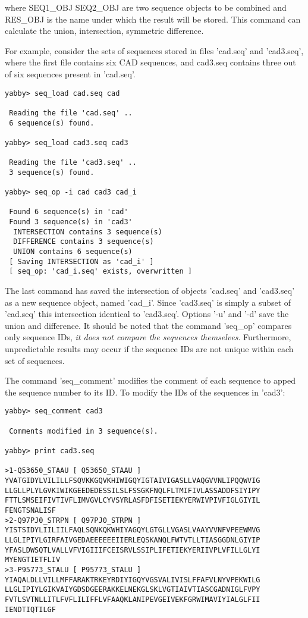 where SEQ1\_OBJ SEQ2\_OBJ are two sequence objects to be combined 
and RES\_OBJ is the name under which the result will be stored.
This command can calculate the union, intersection, symmetric
difference.

For example, consider the sets of sequences stored in files
'cad.seq' and 'cad3.seq', where the first file contains six 
CAD sequences, and cad3.seq contains three out of six sequences
present in 'cad.seq'.

\begin{verbatim}
yabby> seq_load cad.seq cad

 Reading the file 'cad.seq' ..
 6 sequence(s) found.

yabby> seq_load cad3.seq cad3

 Reading the file 'cad3.seq' ..
 3 sequence(s) found.

yabby> seq_op -i cad cad3 cad_i

 Found 6 sequence(s) in 'cad'
 Found 3 sequence(s) in 'cad3'
  INTERSECTION contains 3 sequence(s)
  DIFFERENCE contains 3 sequence(s)
  UNION contains 6 sequence(s)
 [ Saving INTERSECTION as 'cad_i' ]
 [ seq_op: 'cad_i.seq' exists, overwritten ]
\end{verbatim}

The last command has saved the intersection of objects 'cad.seq' and
'cad3.seq' as a new sequence object, named 'cad\_i'. Since 'cad3.seq'
is simply a subset of 'cad.seq' this intersection identical to
'cad3.seq'. Options '-u' and '-d' save the union and difference.
It should be noted that the command 'seq\_op' compares only
sequence IDs, {\em it does not compare the sequences themselves}.
Furthermore, unpredictable results may occur if the sequence IDs
are not unique within each set of sequences. 


The command 'seq\_comment' modifies the comment of each sequence
to apped the sequence number to its ID. To modify the IDs of the
sequences in 'cad3':

\begin{verbatim}
yabby> seq_comment cad3

 Comments modified in 3 sequence(s).

yabby> print cad3.seq

>1-Q53650_STAAU [ Q53650_STAAU ]
YVATGIDYLVILILLFSQVKKGQVKHIWIGQYIGTAIVIGASLLVAQGVVNLIPQQWVIG
LLGLLPLYLGVKIWIKGEEDEDESSILSLFSSGKFNQLFLTMIFIVLASSADDFSIYIPY
FTTLSMSEIFIVTIVFLIMVGVLCYVSYRLASFDFISETIEKYERWIVPIVFIGLGIYIL
FENGTSNALISF
>2-Q97PJ0_STRPN [ Q97PJ0_STRPN ]
YISTSIDYLIILIILFAQLSQNKQKWHIYAGQYLGTGLLVGASLVAAYVVNFVPEEWMVG
LLGLIPIYLGIRFAIVGEDAEEEEEEIIERLEQSKANQLFWTVTLLTIASGGDNLGIYIP
YFASLDWSQTLVALLVFVIGIIIFCEISRVLSSIPLIFETIEKYERIIVPLVFILLGLYI
MYENGTIETFLIV
>3-P95773_STALU [ P95773_STALU ]
YIAQALDLLVILLMFFARAKTRKEYRDIYIGQYVGSVALIVISLFFAFVLNYVPEKWILG
LLGLIPIYLGIKVAIYGDSDGEERAKKELNEKGLSKLVGTIAIVTIASCGADNIGLFVPY
FVTLSVTNLLITLFVFLILIFFLVFAAQKLANIPEVGEIVEKFGRWIMAVIYIALGLFII
IENDTIQTILGF
\end{verbatim}

